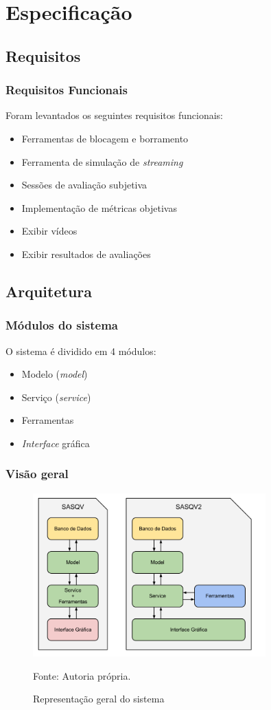 \section{Especificação}


\subsection{Requisitos}
    \begin{frame}\frametitle{Requisitos Funcionais}
	Foram levantados os seguintes requisitos funcionais:
		\begin{itemize}
			\item Ferramentas de blocagem e borramento
			\item Ferramenta de simulação de \emph{streaming}
			\item Sessões de avaliação subjetiva
			\item Implementação de métricas objetivas
			\item Exibir vídeos
			\item Exibir resultados de avaliações
		\end{itemize}
    \end{frame}
    
\subsection{Arquitetura}
    \begin{frame}\frametitle{Módulos do sistema}
	O sistema é dividido em 4 módulos:
		\begin{itemize}
			\item Modelo (\emph{model})
			\item Serviço (\emph{service})
			\item Ferramentas
			\item \emph{Interface} gráfica
		\end{itemize}
    \end{frame}
    
	\begin{frame}\frametitle{Visão geral}
		\begin{figure}
			\includegraphics[width=0.8\textwidth]{./imgs/arquitetura.png}
			\caption{Representação geral do sistema}
			\tiny
			Fonte: Autoria própria.
		\end{figure}
	\end{frame}
